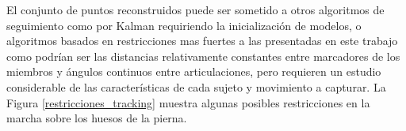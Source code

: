 El conjunto de puntos reconstruidos puede ser sometido a otros algoritmos de seguimiento como por Kalman \cite{kalman} requiriendo la inicialización de modelos, o algoritmos basados en restricciones mas fuertes a las presentadas en este trabajo como podrían ser las distancias relativamente constantes entre marcadores de los miembros y ángulos continuos entre articulaciones, pero requieren un estudio considerable de las características de cada sujeto y movimiento a capturar. La Figura \ref{restricciones_tracking} muestra algunas posibles restricciones en la marcha sobre los huesos de la pierna.

